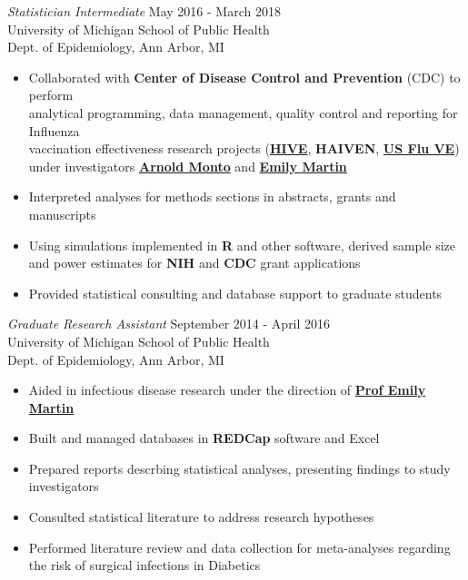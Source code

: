 \documentclass[10pt]{res} %
\begin{document}
\begin{resume}
{\sl Statistician Intermediate} \hfill May 2016 -  March 2018\\
University of Michigan School of Public Health \\
Dept. of Epidemiology, Ann Arbor, MI
\begin{itemize} \itemsep -2pt %
\item Collaborated with \textbf{Center of Disease Control and Prevention} (CDC) to perform\\
analytical programming, data management, quality control and reporting for Influenza\\ vaccination effectiveness research projects (\href{https://sites.google.com/a/umich.edu/hive/home/umsph}{\textbf{HIVE}}, \textbf{HAIVEN}, \href{https://www.cdc.gov/flu/professionals/vaccination/effectiveness-studies.htm}{\textbf{US Flu VE}}) under investigators \href{https://sph.umich.edu/faculty-profiles/monto-arnold.html}{\textbf{Arnold Monto}} and \href{https://sph.umich.edu/faculty-profiles/martin-emily.html}{\textbf{Emily Martin}}
\item Interpreted analyses for methods sections in abstracts, grants and manuscripts 
\item Using simulations implemented in \textbf{R} and other software, derived sample size and power estimates for \textbf{NIH} and \textbf{CDC} grant applications 
\item Provided statistical consulting and database support to graduate students 
\end{itemize}

{\sl Graduate Research Assistant} \hfill September 2014 - April 2016 \\
University of Michigan School of Public Health \\
Dept. of Epidemiology, Ann Arbor, MI
\begin{itemize} \itemsep -2pt %
\item Aided in infectious disease research under the direction of \href{https://sph.umich.edu/faculty-profiles/martin-emily.html}{\textbf{Prof Emily Martin}}
\item Built and managed databases in \textbf{REDCap} software and Excel
\item Prepared reports descrbing statistical analyses, presenting findings to study investigators
\item Consulted statistical literature to address research hypotheses
\item Performed literature review and data collection for meta-analyses regarding the risk of surgical infections in Diabetics
\end{itemize}
 

\end{resume}
\end{document}
